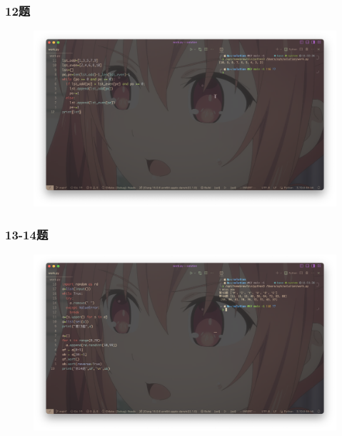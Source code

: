 \documentclass{beamer}
\begin{document}
  \begin{frame}[fragile]
    \frametitle{12题}
    \begin{figure}[!htb] %
      \includegraphics[width=1\textwidth,height=0.8\textheight]{./graph/python-trial-6.12.png} %
    \end{figure}
  \end{frame}
  \begin{frame}[fragile]
    \frametitle{13-14题}
    \begin{figure}[!htb] %
      \includegraphics[width=1\textwidth,height=0.8\textheight]{./graph/python-trial-6.13-6.14.png} %
    \end{figure}
  \end{frame}
\end{document}
